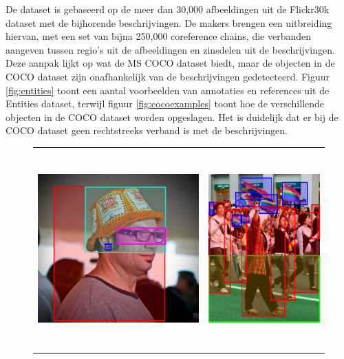 De dataset is gebaseerd op de meer dan 30,000 afbeeldingen uit de Flickr30k  dataset met de bijhorende beschrijvingen. De makers brengen een uitbreiding hiervan, met een set van bijna 250,000 coreference chains, die verbanden aangeven tussen regio's uit de afbeeldingen en zinsdelen uit de beschrijvingen. Deze aanpak lijkt op wat de MS COCO  dataset biedt, maar de objecten in de COCO dataset zijn onafhankelijk van de beschrijvingen gedetecteerd. Figuur \ref{fig:entities} toont een aantal voorbeelden van annotaties en references uit de Entities dataset, terwijl figuur \ref{fig:cocoexamples} toont hoe de verschillende objecten in de COCO dataset worden opgeslagen. Het is duidelijk dat er bij de COCO dataset geen rechtstreeks verband is met de beschrijvingen. 

\begin{figure}[!tb]
    \centering
    \begin{tabular}[t]{cc}
      \includegraphics[height=3.0in]{Images/example_hat.png} \vspace{-3mm}&
      \includegraphics[height=3.0in]{Images/example_parade.png}\\

\end{tabular}
\end{figure}
